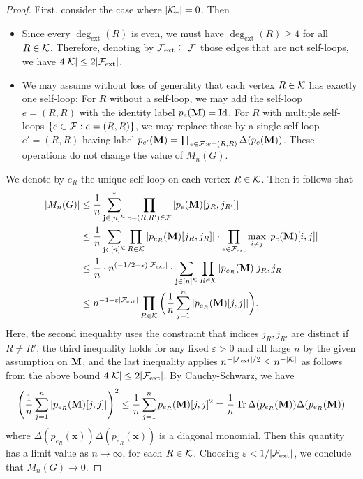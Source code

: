\documentclass[10pt,reqno]{amsart}
\def\x{\mathbf{x}}
\def\eps{\varepsilon}
\def\Tr{\operatorname{Tr}}
\newcommand{\degext}{\deg_\mathrm{ext}}
\newcommand{\ext}{\mathrm{ext}}
\begin{document}
\begin{proof}
First, consider the case where $|\mathcal{K}_*|=0$. Then
\begin{itemize}
\item Since every $\degext(R)$ is even, we must have $\degext(R) \geq 4$
for all $R\in\mathcal{K}$. Therefore, denoting by $\cF_{\ext} \subseteq \cF$ those edges
that are not self-loops, we have $4|\cK| \leq 2|\cF_{\ext}|$.
\item We may assume
without loss of generality that each vertex $R \in \mathcal{K}$ has
exactly one self-loop: For $R$ without a self-loop, we may add the self-loop
$e=(R,R)$ with the identity label $p_e(\mathbf{M})=\mathrm{Id}$. For $R$ with multiple
self-loops $\{e \in \mathcal{F}:e=(R,R)\}$, we may replace these by a single self-loop
$e'=(R,R)$ having label $p_{e'}(\mathbf{M})=\prod_{e \in \mathcal{F}:e=(R,R)}
\Delta(p_e(\mathbf{M}))$.
These operations do not change the value of $M_n(G)$.
\end{itemize}
We denote by $e_R$ the unique self-loop on each vertex
$R \in \mathcal{K}$. Then it follows that 
\begin{align*}
|M_n(G)| &\leq \frac{1}{n}\sum_{\bj\in[n]^{\cK}}^*
	\prod_{e=(R,R')\in\cF} |p_e(\bM)[j_R, j_{R'}]|\\
	&\leq \frac{1}{n} \sum_{\bj \in [n]^{\cK}}
\prod_{R \in \cK} |p_{e_R}(\bM)[j_R,j_R]|
\cdot \prod_{e\in\cF_{\ext}}
	\max_{i\neq j}  |p_e(\bM)[i,j]|\\
	&\leq \frac{1}{n} \cdot n^{(-1/2+\eps)|\cF_{\ext}|}
\cdot \sum_{\bj \in [n]^{\cK}} \prod_{R \in \cK} |p_{e_R}(\bM)[j_R,j_R]|\\
&\leq n^{-1+\eps|\cF_{\ext}|}
\prod_{R \in \cK} \bigg(\frac{1}{n}\sum_{j=1}^n
|p_{e_R}(\bM)[j,j]|\bigg).
\end{align*}
Here, the second inequality uses the constraint that indices $j_R,j_{R'}$ are
distinct if $R \neq R'$, 
the third inequality holds for any fixed $\eps>0$ and all large $n$
by the given assumption on $\mathbf{M}$, and the last inequality applies
$n^{-|\cF_{\ext}|/2} \leq n^{-|\cK|}$ as follows from the above bound
$4|\cK| \leq 2|\cF_{\ext}|$. By Cauchy-Schwarz, we have
\[\Bigg(\frac{1}{n}\sum_{j=1}^n |p_{e_R}(\bM)[j,j]|\Bigg)^2
\leq \frac{1}{n}\sum_{j=1}^n p_{e_R}(\bM)[j,j]^2
=\frac{1}{n}\Tr \Delta(p_{e_R}(\bM))\Delta(p_{e_R}(\bM))\]
where $\Delta(p_{e_R}(\x))\Delta(p_{e_R}(\x))$ is a diagonal monomial. Then
this quantity has a limit value as $n \to \infty$, for each $R \in \mathcal{K}$.
Choosing $\eps<1/|\cF_{\ext}|$, we conclude that $M_n(G) \to 0$.


\end{proof}
\end{document}
